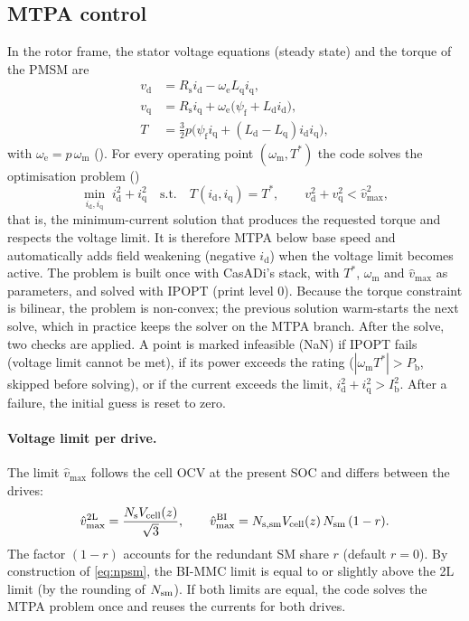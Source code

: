 \subsection{MTPA control}\label{sec:mtpa}
In the rotor frame, the stator voltage equations (steady state) and the torque of the PMSM are
\begin{align}
v_\mathrm{d}&=R_\mathrm{s}i_\mathrm{d}-\omega_\mathrm{e}L_\mathrm{q}i_\mathrm{q}, \label{eq:vd}\\
v_\mathrm{q}&=R_\mathrm{s}i_\mathrm{q}+\omega_\mathrm{e}\big(\psi_\mathrm{f}+L_\mathrm{d}i_\mathrm{d}\big), \label{eq:vq}\\
T&=\tfrac32 p\big(\psi_\mathrm{f}i_\mathrm{q}+(L_\mathrm{d}-L_\mathrm{q})i_\mathrm{d}i_\mathrm{q}\big), \label{eq:torque}
\end{align}
with $\omega_\mathrm{e}=p\,\omega_\mathrm{m}$ (). For every operating point $(\omega_\mathrm{m},T^*)$ the code solves the optimisation problem ()
\begin{equation}
\min_{i_\mathrm{d},i_\mathrm{q}}\; i_\mathrm{d}^2+i_\mathrm{q}^2\quad\text{s.t.}\quad T(i_\mathrm{d},i_\mathrm{q})=T^*,\qquad v_\mathrm{d}^2+v_\mathrm{q}^2< \hat v_\mathrm{max}^2,
\label{eq:mtpa}
\end{equation}
that is, the minimum-current solution that produces the requested torque and respects the voltage limit. It is therefore MTPA below base speed and automatically adds field weakening (negative $i_\mathrm{d}$) when the voltage limit becomes active. The problem is built once with CasADi's  stack, with $T^*$, $\omega_\mathrm{m}$ and $\hat v_\mathrm{max}$ as parameters, and solved with IPOPT (print level 0). Because the torque constraint is bilinear, the problem is non-convex; the previous solution warm-starts the next solve, which in practice keeps the solver on the MTPA branch. After the solve, two checks are applied. A point is marked infeasible (NaN) if IPOPT fails (voltage limit cannot be met), if its power exceeds the rating ($|\omega_\mathrm{m}T^*|>P_\mathrm{b}$, skipped before solving), or if the current exceeds the limit, $i_\mathrm{d}^2+i_\mathrm{q}^2>I_\mathrm{b}^2$. After a failure, the initial guess is reset to zero.

\paragraph{Voltage limit per drive.} The limit $\hat v_\mathrm{max}$ follows the cell OCV at the present SOC and differs between the drives:
\begin{equation}
\hat v_\mathrm{max}^\mathrm{2L}=\frac{N_\mathrm{s}V_\mathrm{cell}(z)}{\sqrt3},\qquad
\hat v_\mathrm{max}^\mathrm{BI}=N_\mathrm{s,sm} V_\mathrm{cell}(z)\,N_\mathrm{sm}\,(1-r).
\label{eq:vmax}
\end{equation}
The factor $(1-r)$ accounts for the redundant SM share $r$ (default $r=0$). By construction of \cref{eq:npsm}, the BI-MMC limit is equal to or slightly above the 2L limit (by the rounding of $N_\mathrm{sm}$). If both limits are equal, the code solves the MTPA problem once and reuses the currents for both drives.

